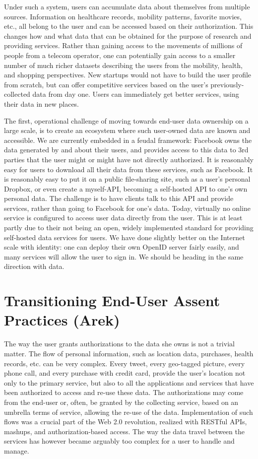 Under such a system, users can accumulate data about themselves from multiple sources.
Information on healthcare records, mobility patterns, favorite movies, etc., all belong to the user and can be accessed based on their authorization.
This changes how and what data that can be obtained for the purpose of research and providing services.
Rather than gaining access to the movements of millions of people from a telecom operator, one can potentially gain access to a smaller number of much richer datasets describing the users from the mobility, health, and shopping perspectives.
New startups would not have to build the user profile from scratch, but can offer competitive services based on the user's previously-collected data from day one.
Users can immediately get better services, using their data in new places.

The first, operational challenge of moving towards end-user data ownership on a large scale, is to create an ecosystem where such user-owned data are known and accessible.
We are currently embedded in a feudal framework: Facebook owns the data generated by and about their users, and provides access to this data to 3rd parties that the user might or might have not directly authorized.
It is reasonably easy for users to download all their data from these services, such as Facebook.
It is reasonably easy to put it on a public file-sharing site, such as a user's personal Dropbox, or even create a myself-API, becoming a self-hosted API to one's own personal data.
The challenge is to have clients talk to this API and provide services, rather than going to Facebook for one's data.
Today, virtually no online service is configured to access user data directly from the user. This is at least partly due to their not being an open, widely implemented standard for providing self-hosted data services for users.
We have done slightly better on the Internet scale with identity: one can deploy their own OpenID server fairly easily, and many services will allow the user to sign in.
We should be heading in the same direction with data.

\section{Transitioning End-User Assent Practices (Arek)}

The way the user grants authorizations to the data she owns is not a trivial matter.
The flow of personal information, such as location data, purchases, health records, etc. can be very complex.
Every tweet, every geo-tagged picture, every phone call, and every purchase with credit card, provide the user's location not only to the primary service, but also to all the applications and services that have been authorized to access and re-use these data.
The authorizations may come from the end-user or, often, be granted by the collecting service, based on an umbrella terms of service, allowing the re-use of the data.
Implementation of such flows was a crucial part of the Web 2.0 revolution, realized with RESTful APIs, mashups, and authorization-based access.
The way the data travel between the services has however became arguably too complex for a user to handle and manage.

